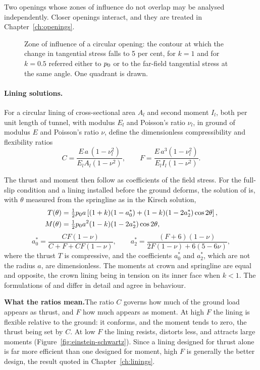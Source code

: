 Two openings whose zones of influence do not overlap may be analysed
independently. Closer openings interact, and they are treated in
Chapter~\ref{ch:openings}.

\begin{figure}[htbp]
\centering
{}
\caption{Zone of influence of a circular opening: the contour at which the change in tangential stress falls to 5 per cent, for $k = 1$ and for $k = 0.5$ referred either to $p_0$ or to the far-field tangential stress at the same angle. One quadrant is drawn.}
\label{fig:influence-contours}
\end{figure}

\paragraph{Lining solutions.}
For a circular lining of cross-sectional area $A_l$ and second moment $I_l$,
both per unit length of tunnel, with modulus $E_l$ and Poisson's ratio
$\nu_l$, in ground of modulus $E$ and Poisson's ratio $\nu$, define the
dimensionless compressibility and flexibility ratios
\[
C = \frac{E\,a\,(1-\nu_l^2)}{E_l A_l (1-\nu^2)},
\qquad
F = \frac{E\,a^3(1-\nu_l^2)}{E_l I_l (1-\nu^2)} .
\]

The thrust and moment then follow as coefficients of the field stress. For the
full-slip condition and a lining installed before the ground deforms, the
solution of \citet{einstein1979simplified} is, with $\theta$ measured from the
springline as in the Kirsch solution,
\begin{align*}
T(\theta) &= \tfrac{1}{2}p_0 a\left[(1+k)(1-a_0^{*})
  + (1-k)(1-2a_2^{*})\cos 2\theta\right],\\
M(\theta) &= \tfrac{1}{2}p_0 a^2 (1-k)(1-2a_2^{*})\cos 2\theta,
\end{align*}
\[
a_0^{*} = \frac{C F (1-\nu)}{C + F + C F (1-\nu)},
\qquad
a_2^{*} = \frac{(F+6)(1-\nu)}{2F(1-\nu) + 6(5-6\nu)},
\]
where the thrust $T$ is compressive, and the coefficients $a_0^{*}$ and
$a_2^{*}$, which are not the radius $a$, are dimensionless. The moments at crown
and springline are equal and opposite, the crown lining being in tension on its
inner face when $k < 1$. The formulations of \citet{muirwood1975} and
\citet{duddeck1985structural} differ in detail and agree in behaviour.

\noindent\textbf{What the ratios mean.}\enspace The ratio $C$ governs how much
of the ground load appears as thrust, and $F$ how much appears as moment. At
high $F$ the lining is flexible relative to the ground: it conforms, and the
moment tends to zero, the thrust being set by $C$. At low $F$ the lining
resists, distorts less, and attracts large moments
(Figure~\ref{fig:einstein-schwartz}). Since a lining designed
for thrust alone is far more efficient than one designed for moment, high $F$
is generally the better design, the result quoted in
Chapter~\ref{ch:linings}.

